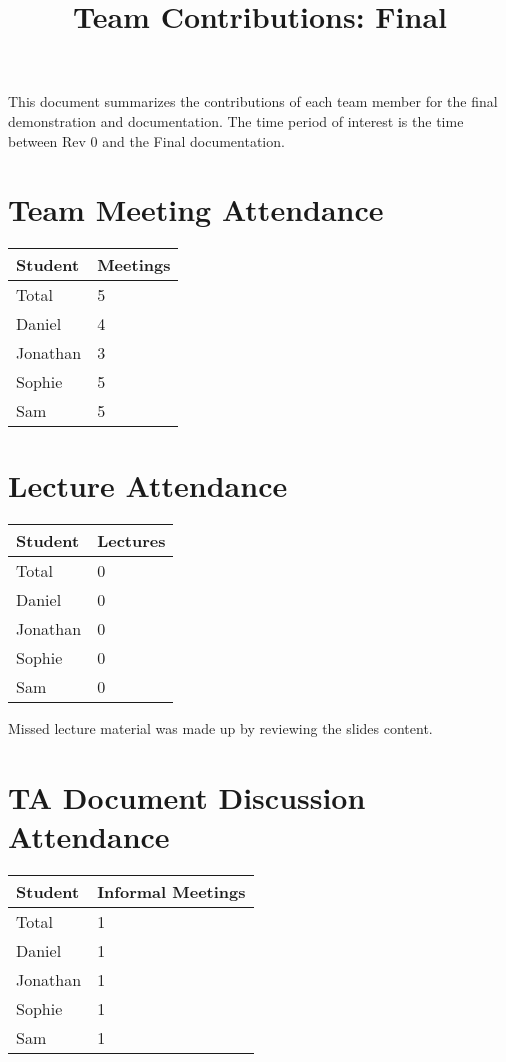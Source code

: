 \documentclass{article}
\title{Team Contributions: Final\\\progname}
\author{\authname}
\date{}
\begin{document}
\maketitle

This document summarizes the contributions of each team member for the final
demonstration and documentation.  The time period of interest is the time
between Rev 0 and the Final documentation.

\section{Team Meeting Attendance}

\begin{table}[H]
\centering
\begin{tabular}{ll}
\toprule
\textbf{Student} & \textbf{Meetings}\\
\midrule
Total & 5\\
Daniel & 4\\
Jonathan & 3\\
Sophie & 5\\
Sam & 5\\
\bottomrule
\end{tabular}
\end{table}


\section{Lecture Attendance}

\begin{table}[H]
\centering
\begin{tabular}{ll}
\toprule
\textbf{Student} & \textbf{Lectures}\\
\midrule
Total & 0\\
Daniel & 0\\
Jonathan & 0\\
Sophie & 0\\
Sam & 0\\
\bottomrule
\end{tabular}
\end{table}

Missed lecture material was made up by reviewing the slides content.

\section{TA Document Discussion Attendance}

\begin{table}[H]
\centering
\begin{tabular}{ll}
\toprule
\textbf{Student} & \textbf{Informal Meetings}\\
\midrule
Total & 1\\
Daniel & 1\\
Jonathan & 1\\
Sophie & 1\\
Sam & 1\\
\bottomrule
\end{tabular}
\end{table}
\end{document}
